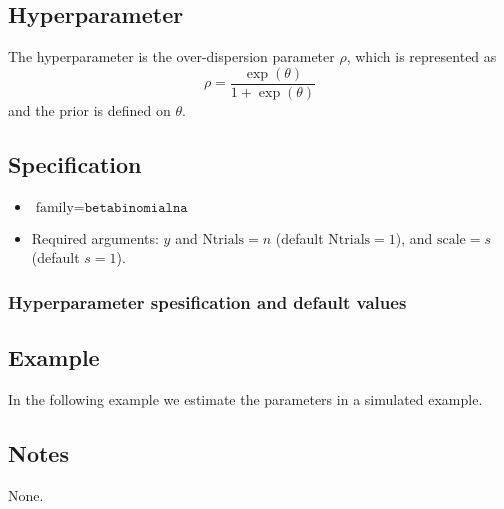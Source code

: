 \documentclass[a4paper,11pt]{article}
\begin{document}
\subsection*{Hyperparameter}

The hyperparameter is the over-dispersion parameter $\rho$, which is
represented as
\begin{displaymath}
    \rho = \frac{\exp(\theta)}{1+\exp(\theta)}
\end{displaymath}
and the prior is defined on $\theta$. 

\subsection*{Specification}

\begin{itemize}
\item $\text{family}=\texttt{betabinomialna}$
\item Required arguments: $y$ and $\text{Ntrials} = n$ (default
    $\text{Ntrials}=1$), and $\text{scale} = s$ (default $s=1$).
\end{itemize}

\subsubsection*{Hyperparameter spesification and default values}


\subsection*{Example}

In the following example we estimate the parameters in a simulated
example.


\subsection*{Notes}

None.
\end{document}
